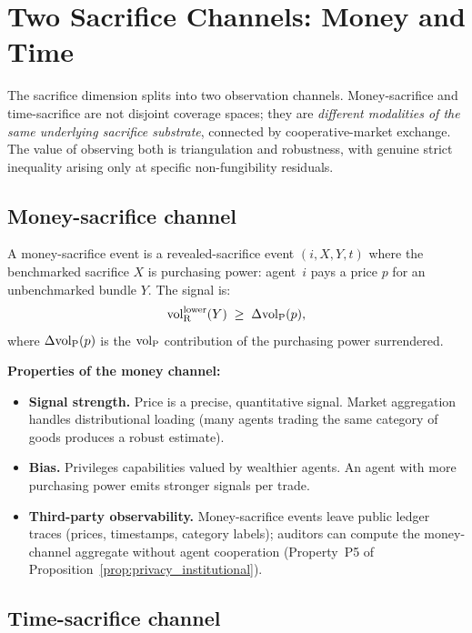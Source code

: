 \section{Two Sacrifice Channels: Money and Time}
\label{sec:two_channels}

The sacrifice dimension splits into two observation channels.
Money-sacrifice and time-sacrifice are not disjoint coverage
spaces; they are \emph{different modalities of the same
underlying sacrifice substrate}, connected by cooperative-market
exchange.  The value of observing both is triangulation and
robustness, with genuine strict inequality arising only at
specific non-fungibility residuals.

\subsection{Money-sacrifice channel}

\begin{definition}
\label{def:money_sacrifice}
A money-sacrifice event is a revealed-sacrifice event
$(i, X, Y, t)$ where the benchmarked sacrifice $X$ is purchasing
power: agent~$i$ pays a price $p$ for an unbenchmarked bundle $Y$.
The signal is:
\[
  {\operatorname{vol}_{\mathrm{R}}^{\mathrm{lower}}}(Y) \;\geq\; \Delta{\operatorname{vol}_{\mathrm{P}}}(p),
\]
where $\Delta{\operatorname{vol}_{\mathrm{P}}}(p)$ is the ${\operatorname{vol}_{\mathrm{P}}}$ contribution of the
purchasing power surrendered.
\end{definition}

\noindent\textbf{Properties of the money channel:}
\begin{itemize}
\item \textbf{Signal strength.}  Price is a precise, quantitative
  signal.  Market aggregation handles distributional loading (many
  agents trading the same category of goods produces a robust
  estimate).
\item \textbf{Bias.}  Privileges capabilities valued by wealthier
  agents.  An agent with more purchasing power emits stronger
  signals per trade.
\item \textbf{Third-party observability.}  Money-sacrifice events
  leave public ledger traces (prices, timestamps, category
  labels); auditors can compute the money-channel aggregate
  without agent cooperation (Property~P5 of
  Proposition~\ref{prop:privacy_institutional}).
\end{itemize}

\subsection{Time-sacrifice channel}

